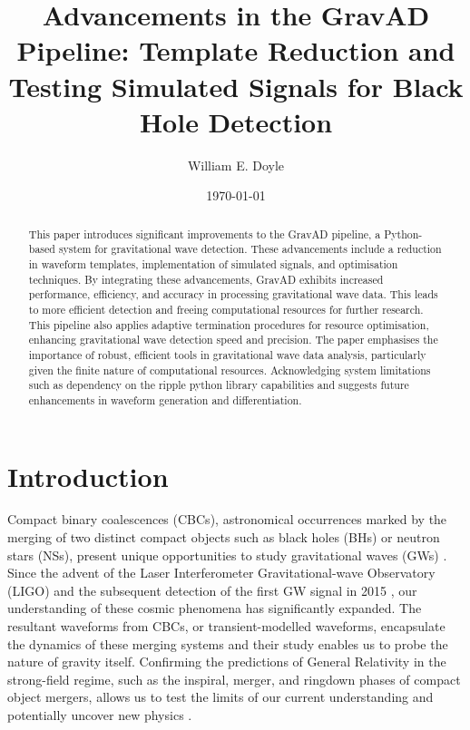 \documentclass[twocolumn, aps, pra]{revtex4-2}
\begin{document}
	
	\title{Advancements in the GravAD Pipeline: Template Reduction and Testing Simulated Signals for Black Hole Detection}
	
	\author{William E. Doyle}
	
	\date{\today}
	
	\begin{abstract}
This paper introduces significant improvements to the GravAD pipeline, a Python-based system for gravitational wave detection. These advancements include a reduction in waveform templates, implementation of simulated signals, and optimisation techniques. By integrating these advancements, GravAD exhibits increased performance, efficiency, and accuracy in processing gravitational wave data. This leads to more efficient detection and freeing computational resources for further research. This pipeline also applies adaptive termination procedures for resource optimisation, enhancing gravitational wave detection speed and precision. The paper emphasises the importance of robust, efficient tools in gravitational wave data analysis, particularly given the finite nature of computational resources. Acknowledging system limitations such as dependency on the ripple python library capabilities and suggests future enhancements in waveform generation and differentiation. 
	\end{abstract}
	
	
	\maketitle
	
	\section{Introduction}
	
	Compact binary coalescences (CBCs), astronomical occurrences marked by the merging of two distinct compact objects such as black holes (BHs) or neutron stars (NSs), present unique opportunities to study gravitational waves (GWs) \cite{gw_sources}. Since the advent of the Laser Interferometer Gravitational-wave Observatory (LIGO) and the subsequent detection of the first GW signal in 2015 \cite{abbott_2016}, our understanding of these cosmic phenomena has significantly expanded. The resultant waveforms from CBCs, or transient-modelled waveforms, encapsulate the dynamics of these merging systems and their study enables us to probe the nature of gravity itself. Confirming the predictions of General Relativity in the strong-field regime, such as the inspiral, merger, and ringdown phases of compact object mergers, allows us to test the limits of our current understanding and potentially uncover new physics \cite{Abram_1992}.
	
\end{document}
